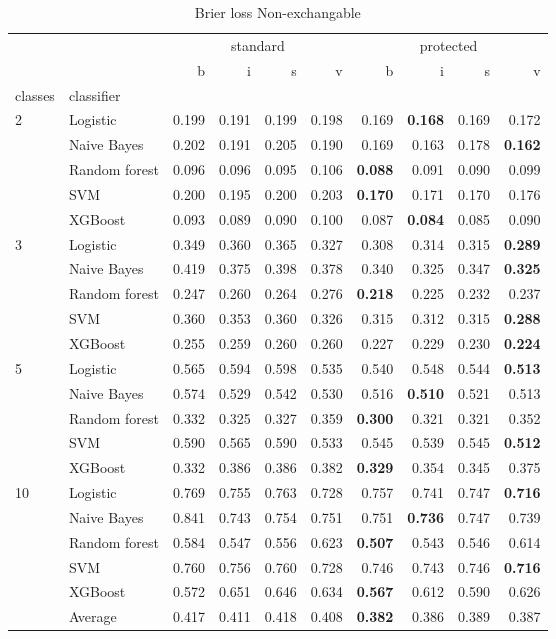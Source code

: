 \begin{table}
\caption{Brier loss Non-exchangable}
\begin{tabular}{l|l|rrrr|rrrr}
\toprule
 &  & \multicolumn{4}{c}{standard} & \multicolumn{4}{c}{protected} \\
 &  & b & i & s & v & b & i & s & v \\
classes & classifier &  &  &  &  &  &  &  &  \\
\midrule
\midrule
\multirow[c]{5}{*}{2} & Logistic & 0.199 & 0.191 & 0.199 & 0.198 & 0.169 & \textbf{0.168} & 0.169 & 0.172 \\
 & Naive Bayes & 0.202 & 0.191 & 0.205 & 0.190 & 0.169 & 0.163 & 0.178 & \textbf{0.162} \\
 & Random forest & 0.096 & 0.096 & 0.095 & 0.106 & \textbf{0.088} & 0.091 & 0.090 & 0.099 \\
 & SVM & 0.200 & 0.195 & 0.200 & 0.203 & \textbf{0.170} & 0.171 & 0.170 & 0.176 \\
 & XGBoost & 0.093 & 0.089 & 0.090 & 0.100 & 0.087 & \textbf{0.084} & 0.085 & 0.090 \\
\midrule
\multirow[c]{5}{*}{3} & Logistic & 0.349 & 0.360 & 0.365 & 0.327 & 0.308 & 0.314 & 0.315 & \textbf{0.289} \\
 & Naive Bayes & 0.419 & 0.375 & 0.398 & 0.378 & 0.340 & 0.325 & 0.347 & \textbf{0.325} \\
 & Random forest & 0.247 & 0.260 & 0.264 & 0.276 & \textbf{0.218} & 0.225 & 0.232 & 0.237 \\
 & SVM & 0.360 & 0.353 & 0.360 & 0.326 & 0.315 & 0.312 & 0.315 & \textbf{0.288} \\
 & XGBoost & 0.255 & 0.259 & 0.260 & 0.260 & 0.227 & 0.229 & 0.230 & \textbf{0.224} \\
\midrule
\multirow[c]{5}{*}{5} & Logistic & 0.565 & 0.594 & 0.598 & 0.535 & 0.540 & 0.548 & 0.544 & \textbf{0.513} \\
 & Naive Bayes & 0.574 & 0.529 & 0.542 & 0.530 & 0.516 & \textbf{0.510} & 0.521 & 0.513 \\
 & Random forest & 0.332 & 0.325 & 0.327 & 0.359 & \textbf{0.300} & 0.321 & 0.321 & 0.352 \\
 & SVM & 0.590 & 0.565 & 0.590 & 0.533 & 0.545 & 0.539 & 0.545 & \textbf{0.512} \\
 & XGBoost & 0.332 & 0.386 & 0.386 & 0.382 & \textbf{0.329} & 0.354 & 0.345 & 0.375 \\
\midrule
\multirow[c]{5}{*}{10} & Logistic & 0.769 & 0.755 & 0.763 & 0.728 & 0.757 & 0.741 & 0.747 & \textbf{0.716} \\
 & Naive Bayes & 0.841 & 0.743 & 0.754 & 0.751 & 0.751 & \textbf{0.736} & 0.747 & 0.739 \\
 & Random forest & 0.584 & 0.547 & 0.556 & 0.623 & \textbf{0.507} & 0.543 & 0.546 & 0.614 \\
 & SVM & 0.760 & 0.756 & 0.760 & 0.728 & 0.746 & 0.743 & 0.746 & \textbf{0.716} \\
 & XGBoost & 0.572 & 0.651 & 0.646 & 0.634 & \textbf{0.567} & 0.612 & 0.590 & 0.626 \\\midrule\ & Average & 0.417 & 0.411 & 0.418 & 0.408 & \textbf{0.382} & 0.386 & 0.389 & 0.387 \\
\bottomrule
\end{tabular}
\end{table}
